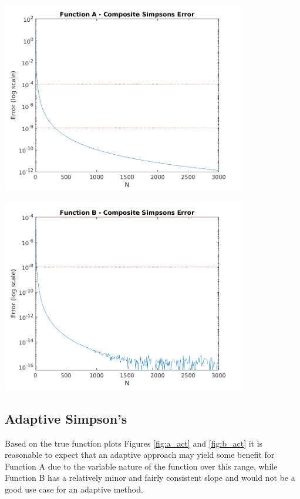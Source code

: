 \documentclass[a4paper]{article}
\begin{document}
\begin{center}
	\includegraphics[width=0.8\textwidth]{../output/a_simpsons.png}
	\label{fig:a_sim}
\end{center}


\begin{center}
	\includegraphics[width=0.8\textwidth]{../output/b_simpsons.png}
	\label{fig:b_sim}
\end{center}



\subsection{Adaptive Simpson's}\label{results:adaptive}

Based on the true function plots Figures \ref{fig:a_act} and \ref{fig:b_act} it is reasonable to expect that an adaptive approach may yield some benefit for Function A due to the variable nature of the function over this range, while Function B has a relatively minor and fairly consistent slope and would not be a good use case for an adaptive method.
\end{document}
